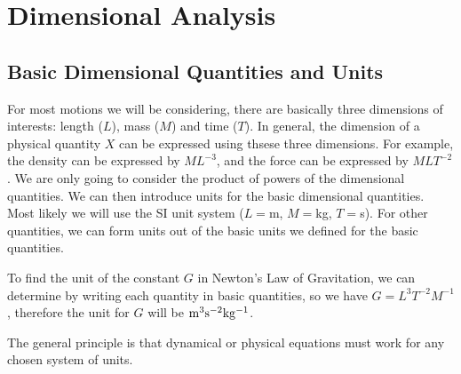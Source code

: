 \section{Dimensional Analysis}
\subsection{Basic Dimensional Quantities and Units}
For most motions we will be considering, there are basically three dimensions of interests: length ($L$), mass ($M$) and time ($T$).
In general, the dimension of a physical quantity $X$ can be expressed using thsese three dimensions.
For example, the density can be expressed by $ML^{-3}$, and the force can be expressed by $MLT^{-2}$.
We are only going to consider the product of powers of the dimensional quantities.
We can then introduce units for the basic dimensional quantities.
Most likely we will use the SI unit system ($L=$m, $M=$kg, $T=$s).
For other quantities, we can form units out of the basic units we defined for the basic quantities.
\begin{example}
    To find the unit of the constant $G$ in Newton's Law of Gravitation, we can determine by writing each quantity in basic quantities, so we have $G=L^3T^{-2}M^{-1}$, therefore the unit for $G$ will be ${\rm m^3s^{-2}kg^{-1}}$.
\end{example}
The general principle is that dynamical or physical equations must work for any chosen system of units.
